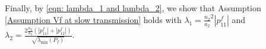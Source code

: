 %
Finally, by \eqref{eqn: lambda_1 and lambda_2}, we show that Assumption \ref{Assumption Vf at slow transmission} holds
with $\lambda_1 = \tfrac{n_2}{a_2}^2|p_{11}^f|$ and $\lambda_2 = \tfrac{2\frac{n_2}{a_2}(|p_{11}^f| + |p_{12}^f|)}{\sqrt{\lambda_\text{min}(P_f)}}$.




